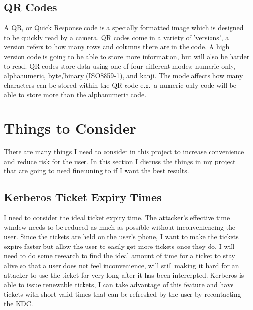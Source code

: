 \documentclass[]{report}   %
\begin{document}
 
\subsection{QR Codes}  
A QR, or Quick Response code \cite{QR} is a specially formatted image which is designed to be quickly read by a camera. QR codes come in a variety of 'versions', a version refers to how many rows and columns there are in the code. A high version code is going to be able to store more information, but will also be harder to read. QR codes store data using one of four different modes: numeric only, alphanumeric, byte/binary (ISO8859-1), and kanji. The mode affects how many characters can be stored within the QR code e.g.\ a numeric only code will be able to store more than the alphanumeric code.

\section{Things to Consider}
There are many things I need to consider in this project to increase convenience and reduce risk for the user. In this section I discuss the things in my project that are going to need finetuning to if I want the best results.

\subsection{Kerberos Ticket Expiry Times} 
I need to consider the ideal ticket expiry time. The attacker's effective time window needs to be reduced as much as possible without inconveniencing the user. Since the tickets are held on the user’s phone, I want to make the tickets expire faster but allow the user to easily get more tickets once they do. I will need to do some research to find the ideal amount of time for a ticket to stay alive so that a user does not feel inconvenience, will still making it hard for an attacker to use the ticket for very long after it has been intercepted. Kerberos is able to issue renewable tickets, I can take advantage of this feature and have tickets with short valid times that can be refreshed by the user by recontacting the KDC.
\end{document}
